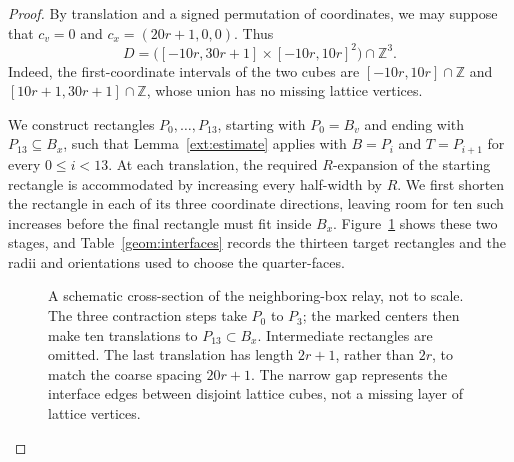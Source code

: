 \begin{proof}
By translation and a signed permutation of coordinates, we may suppose that
$c_v=0$ and $c_x=(20r+1,0,0)$. Thus
\begin{equation}\label{geom:prism}
  D=\bigl([-10r,30r+1]\times[-10r,10r]^2\bigr)\cap\mathbb Z^3.
\end{equation}
Indeed, the first-coordinate intervals of the two cubes are
$[-10r,10r]\cap\mathbb Z$ and $[10r+1,30r+1]\cap\mathbb Z$, whose union has
no missing lattice vertices.

We construct rectangles $P_0,\ldots,P_{13}$, starting with $P_0=B_v$ and
ending with $P_{13}\subseteq B_x$, such that
Lemma~\ref{ext:estimate} applies with $B=P_i$ and $T=P_{i+1}$ for every
$0\le i<13$. At each translation, the required $R$-expansion of the starting
rectangle is accommodated by increasing every half-width by $R$.
We first shorten the rectangle in each of its three coordinate directions,
leaving room for ten such increases before the final rectangle must fit
inside $B_x$. Figure~\ref{geom:figure} shows these two stages, and
Table~\ref{geom:interfaces} records the thirteen target rectangles and
the radii and orientations used to choose the quarter-faces.

\begin{figure}[tbp]
\centering
{}
\caption{A schematic cross-section of the neighboring-box relay, not to scale.
The three contraction steps take $P_0$ to $P_3$; the marked centers then make
ten translations to $P_{13}\subset B_x$. Intermediate rectangles are omitted.
The last translation has length $2r+1$, rather than $2r$, to match the coarse
spacing $20r+1$. The narrow gap represents the interface edges between disjoint
lattice cubes, not a missing layer of lattice vertices.}
\label{geom:figure}
\end{figure}


\end{proof}

